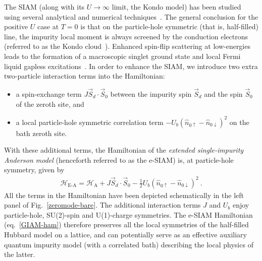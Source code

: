 \documentclass{iopart}
\begin{document}
The SIAM (along with its \(U \to \infty\) limit, the Kondo model) has been studied using several analytical and numerical techniques~\cite{anderson1969exact,anderson1970exact,anderson1970,haldane1978scaling,jefferson_1977,wilson1975,hrk_wilson_1980,andrei_1980,andreiKondoreview,Wiegmann_1981,tsvelickKondoreview,kotliar_1996,Duki_2011,borda_2008,streib_2013,anirban_kondo}. 
The general conclusion for the positive \(U\) case at \(T=0\) is that on the particle-hole symmetric (that is, half-filled) line, the impurity local moment is always screened by the conduction electrons (referred to as the Kondo cloud~\cite{sorensen_erik_affleck_1996,affleck_ian_2001,simon_pascal_2003,martin2010,martin2019,Goldhaber-Gordon1998,Cronenwett1998,Schmid_Weis1998,pustilnik_glazman_2004,Borzenets2020,neel_berndt_2008,Zhao2005}). Enhanced spin-flip scattering at low-energies leads to the formation of a macroscopic singlet ground state and local Fermi liquid gapless excitations~\cite{nozaki2012,mora_2015}.
In order to enhance the SIAM, we introduce two extra two-particle interaction terms into the Hamiltonian:
\begin{itemize}
	\item a spin-exchange term \(J \vec{S}_d\cdot\vec{S}_0\) between the impurity spin \(\vec S_d\) and the spin \(\vec S_0\) of the zeroth site, and 
	\item a local particle-hole symmetric correlation term \(-U_b \left(\hat n_{0 \uparrow} - \hat n_{0 \downarrow}\right)^2\) on the bath zeroth site.
\end{itemize}

With these additional terms, the Hamiltonian of the {\it extended single-impurity Anderson model} (henceforth referred to as the e-SIAM) is, at particle-hole symmetry, given by
\begin{eqnarray}
	\label{GIAM-ham}
	\mathcal{H}_\text{E-A} = \mathcal{H}_\text{A} + J \vec{S}_d\cdot\vec{S}_0 - \frac{1}{2}U_b \left(\hat n_{0 \uparrow} - \hat n_{0 \downarrow}\right)^2~.
\end{eqnarray}
All the terms in the Hamiltonian have been depicted schematically in the left panel of Fig.~\eqref{zeromode-bare}. The additional interaction terms \(J\) and \(U_b\) enjoy particle-hole, SU(2)-spin and U(1)-charge symmetries. The e-SIAM Hamiltonian (eq.~\eqref{GIAM-ham}) therefore preserves all the local symmetries of the half-filled Hubbard model on a lattice, and can potentially serve as an effective auxiliary quantum impurity model (with a correlated bath) describing the local physics of the latter.
\end{document}

